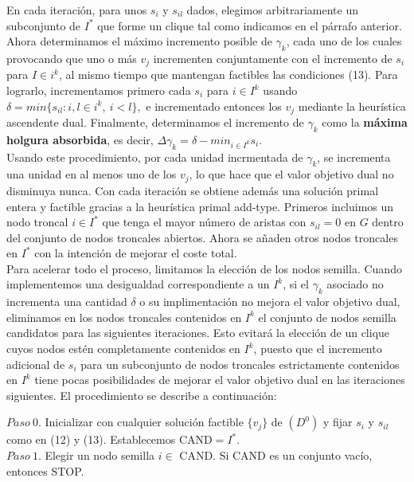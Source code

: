 \documentclass[twoside,12pt]{article}
\begin{document}
En cada iteración, para unos $s_{i}$ y $s_{il}$ dados, elegimos arbitrariamente un subconjunto de $I^{*}$ que forme un clique tal como indicamos en el párrafo anterior. Ahora determinamos el máximo incremento posible de $\gamma_{k}$, cada uno de los cuales provocando que uno o más $v_{j}$ incrementen conjuntamente con el incremento de $s_{i}$ para $I\in i^{k}$, al mismo tiempo que mantengan factibles las condiciones (13). Para lograrlo, incrementamos primero cada $s_{i}$ para $i\in I^{k}$ usando $\delta=min\{s_{il}:i,l \in i^{k},\ i<l\},$ e incrementado entonces los $v_{j}$ mediante la heurística ascendente dual. Finalmente, determinamos el incremento de $\gamma_{k}$ como la \textbf{máxima holgura absorbida}, es decir, $\Delta\gamma_{k}=\delta-min_{i\in I^{k}}s_{i}$.\\

Usando este procedimiento, por cada unidad incrmentada de $\gamma_{k}$, se incrementa una unidad en al menos uno de los $v_{j}$, lo que hace que el valor objetivo dual no disminuya nunca. Con cada iteración se obtiene además una solución primal entera y factible gracias a la heurística primal add-type. Primeros incluimos un nodo troncal $i\in I^{*}$ que tenga el mayor número de aristas con $s_{il}=0$ en $G$ dentro del conjunto de nodos troncales abiertos. Ahora se añaden otros nodos troncales en $I^{*}$ con la intención de mejorar el coste total.\\

Para acelerar todo el proceso, limitamos la elección de los nodos semilla. Cuando implementemos una desigualdad correspondiente a un $I^{k}$, si el $\gamma_{k}$ asociado no incrementa una cantidad $\delta$ o su implimentación no mejora el valor objetivo dual, eliminamos en los nodos troncales contenidos en $I^{k}$ el conjunto de nodos semilla candidatos para las siguientes iteraciones. Esto evitará la elección de un clique cuyos nodos estén completamente contenidos en $I^{k}$, puesto que el incremento adicional de $s_{i}$ para un subconjunto de nodos troncales estrictamente contenidos en $I^{k}$ tiene pocas posibilidades de mejorar el valor objetivo dual en las iteraciones siguientes. El procedimiento se describe a continuación:

$Paso \ 0$. Inicializar con cualquier solución factible $\{v_{j}\}$ de $(D^{0})$ y fijar $s_{i}$ y $s_{il}$ como en (12) y (13). Establecemos $\text{CAND}=I^{*}$.\\

$Paso\ 1$. Elegir un nodo semilla $i\in$ CAND. Si CAND es un conjunto vacío, entonces STOP.\\
\end{document}
